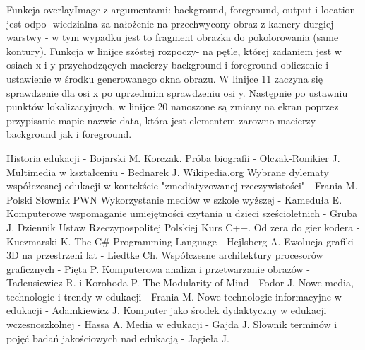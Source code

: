 \documentclass{article}
\begin{document}
Funkcja overlayImage z argumentami: background, foreground, output i location jest odpo- wiedzialna za nałożenie na przechwycony obraz z kamery durgiej warstwy - w tym wypadku jest to fragment obrazka do pokolorowania (same kontury).
Funkcja w linijce szóstej rozpoczy- na pętle, której zadaniem jest w osiach x i y przychodzących macierzy background i foreground obliczenie i ustawienie w środku generowanego okna obrazu. W linijce 11 zaczyna się sprawdzenie dla osi x po uprzedmim sprawdzeniu osi y. Następnie po ustawniu punktów lokalizacyjnych, w linijce 20 nanoszone są zmiany na ekran poprzez przypisanie mapie nazwie data, która jest elementem zarowno macierzy background jak i foreground.

\newpage




\renewcommand\lstlistlistingname{Fragmenty kodu}
\begin{lstlistoflistings}
\end{lstlistoflistings}


\newpage %
\renewcommand\refname{\section*{Bibliografia}}
\begin{thebibliography}{30}\linespread{1}\normalsize{
		Historia edukacji - Bojarski M.
		Korczak. Próba biografii - Olczak-Ronikier J.
		Multimedia w kształceniu - Bednarek J.
		Wikipedia.org
		Wybrane dylematy współczesnej edukacji w kontekście "zmediatyzowanej rzeczywistości" - Frania M.
		Polski Słownik PWN
		Wykorzystanie mediów w szkole wyższej - Kameduła E.
		Komputerowe wspomaganie umiejętności czytania u dzieci sześcioletnich - Gruba J.
		Dziennik Ustaw Rzeczypospolitej Polskiej
		Kurs C++. Od zera do gier kodera - Kuczmarski K.
		The C# Programming Language - Hejlsberg A.
		Ewolucja grafiki 3D na przestrzeni lat - Liedtke Ch.
		Współczesne architektury procesorów graficznych - Pięta P.
		Komputerowa analiza i przetwarzanie obrazów - Tadeusiewicz R. i Korohoda P.
		The Modularity of Mind - Fodor J.
		Nowe media, technologie i trendy w edukacji - Frania M.
		Nowe technologie informacyjne w edukacji - Adamkiewicz J.
		Komputer jako środek dydaktyczny w edukacji wczesnoszkolnej - Hassa A.
		Media w edukacji - Gajda J.
		Słownik terminów i pojęć badań jakościowych nad edukacją - Jagieła J.
	}
\end{thebibliography}
\end{document}
